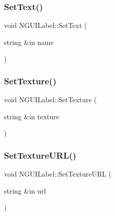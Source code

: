 \hypertarget{class_n_g_u_i_label_a79f65e56bed8dc1a698d5fe1fa16d70e}{}\label{class_n_g_u_i_label_a79f65e56bed8dc1a698d5fe1fa16d70e} 
\subsubsection{\texorpdfstring{Set\+Text()}{SetText()}}
{\footnotesize\ttfamily void N\+G\+U\+I\+Label\+::\+Set\+Text (\begin{DoxyParamCaption}\item[{string \&in}]{name }\end{DoxyParamCaption})}

\hypertarget{class_n_g_u_i_label_ad6809d5317f3013a693954232e03b60b}{}\label{class_n_g_u_i_label_ad6809d5317f3013a693954232e03b60b} 
\subsubsection{\texorpdfstring{Set\+Texture()}{SetTexture()}}
{\footnotesize\ttfamily void N\+G\+U\+I\+Label\+::\+Set\+Texture (\begin{DoxyParamCaption}\item[{string \&in}]{texture }\end{DoxyParamCaption})}

\hypertarget{class_n_g_u_i_label_a8770fa21322b39e537b1c74260dad4a7}{}\label{class_n_g_u_i_label_a8770fa21322b39e537b1c74260dad4a7} 
\subsubsection{\texorpdfstring{Set\+Texture\+U\+R\+L()}{SetTextureURL()}}
{\footnotesize\ttfamily void N\+G\+U\+I\+Label\+::\+Set\+Texture\+U\+RL (\begin{DoxyParamCaption}\item[{string \&in}]{url }\end{DoxyParamCaption})}

\hypertarget{class_n_g_u_i_label_ae1502b807847f48cc700069c76903112}{}\label{class_n_g_u_i_label_ae1502b807847f48cc700069c76903112} 
